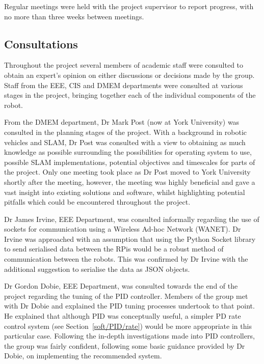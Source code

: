 Regular meetings were held with the project supervisor to report progress, with no
more than three weeks between meetings.



\subsection{Consultations}\label{pm/consultations}
Throughout the project several members of academic staff
were consulted to obtain an expert's opinion on either
discussions or decisions made by the group.
Staff from the EEE, CIS and DMEM departments were
consulted at various stages in the project, bringing together
each of the individual components of the robot.

From the DMEM department, Dr Mark Post (now at York University)
was consulted in the planning stages of the project. With a
background in robotic vehicles and SLAM, Dr Post was consulted
with a view to obtaining as much knowledge as possible
surrounding the possibilities for operating system to use,
possible SLAM implementations, potential objectives and
timescales for parts of the project. Only one meeting took place
as Dr Post moved to York University shortly after the meeting,
however, the meeting was highly beneficial and gave a vast
insight into existing solutions and software, whilst highlighting
potential pitfalls which could be encountered throughout
the project.

Dr James Irvine, EEE Department, was consulted informally
regarding the use of sockets for communication using a Wireless
Ad-hoc Network (WANET). Dr Irvine was approached with an
assumption that using the Python Socket library to send
serialised data between the RPis would be a robust
method of communication between the robots. This was confirmed
by Dr Irvine with the additional suggestion to serialise the data
as JSON objects.


Dr Gordon Dobie, EEE Department, was consulted towards the end
of the project regarding the tuning of the PID controller.
Members of the group met with Dr Dobie and explained the PID tuning
processes undertook to that point. He explained that although
PID was conceptually useful, a simpler PD rate control system (see Section~\ref{soft/PID/rate}) would be more appropriate
in this particular case. Following the in-depth investigations made
into PID controllers, the group was fairly confident, following some
basic guidance provided by Dr Dobie, on implementing the
recommended system.

